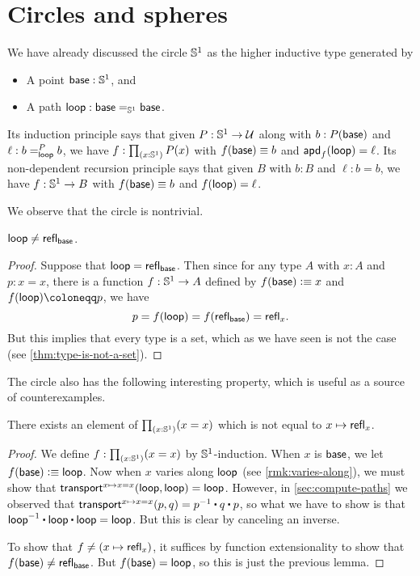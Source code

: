 %

\section{Circles and spheres}
\label{sec:circle}

%
We have already discussed the circle $\Sn^1$ as the higher inductive type generated by
\begin{itemize}
\item A point $\base:\Sn^1$, and
\item A path $\lloop : {\id[\Sn^1]\base\base}$.
\end{itemize}
%
Its induction principle says that given $P:\Sn^1\to\type$ along with $b:P(\base)$ and $\ell :\dpath P \lloop b b$, we have $f:\prd{x:\Sn^1} P(x)$ with $f(\base)\jdeq b$ and $\apd f \lloop = \ell$.
Its non-dependent recursion principle says that given $B$ with $b:B$ and $\ell:b=b$, we have $f:\Sn^1\to B$ with $f(\base)\jdeq b$ and $\ap f \lloop = \ell$.

We observe that the circle is nontrivial.

\begin{lem}\label{thm:loop-nontrivial}
  $\lloop\neq\refl{\base}$.
\end{lem}
\begin{proof}
  Suppose that $\lloop=\refl{\base}$.
  Then since for any type $A$ with $x:A$ and $p:x=x$, there is a function $f:\Sn^1\to A$ defined by $f(\base)\defeq x$ and $\ap f \lloop \defid p$, we have
  \[p = f(\lloop) = f(\refl{\base}) = \refl{x}.\]
  But this implies that every type is a set, which as we have seen is not the case (see \autoref{thm:type-is-not-a-set}).
\end{proof}

The circle also has the following interesting property, which is useful as a source of counterexamples.

\begin{lem}\label{thm:S1-autohtpy}
  There exists an element of $\prd{x:\Sn^1} (x=x)$ which is not equal to $x\mapsto \refl{x}$.
\end{lem}
\begin{proof}
  We define $f:\prd{x:\Sn^1} (x=x)$ by $\Sn^1$-induction.
  When $x$ is $\base$, we let $f(\base)\defeq \lloop$.
  Now when $x$ varies along $\lloop$ (see \autoref{rmk:varies-along}), we must show that $\transfib{x\mapsto x=x}{\lloop}{\lloop} = \lloop$.
  However, in \autoref{sec:compute-paths} we observed that $\transfib{x\mapsto x=x}{p}{q} = \opp{p} \ct q \ct p$, so what we have to show is that $\opp{\lloop} \ct \lloop \ct \lloop = \lloop$.
  But this is clear by canceling an inverse.

  To show that $f\neq (x\mapsto \refl{x})$, it suffices by function extensionality to show that $f(\base) \neq \refl{\base}$.
  But $f(\base)=\lloop$, so this is just the previous lemma.
\end{proof}

